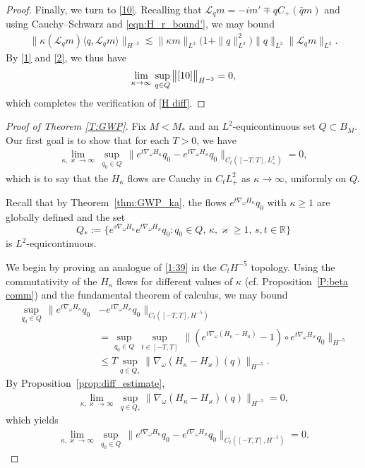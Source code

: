 \documentclass{amsart}
\numberwithin{equation}{section}
\theoremstyle{definition}
\newcommand{\om}{\omega}
\newcommand{\ka}{\kappa}
\newcommand{\vk}{\varkappa}
\newcommand{\R}{\mathbb{R}}
\newcommand{\Q}{\mathcal{Q}}
\newcommand{\Lc}{\mathcal{L}}
\newcommand{\na}{\nabla}
\begin{document}
\begin{proof}
Finally, we turn to \eqref{10}.  Recalling that $\Lc_qm=-im'\mp qC_+(\bar q m)$ and using Cauchy--Schwarz and \eqref{eqn:H_r_bound'}, we may bound
\begin{align*}
\bigl\|\ka (\Lc_qm)\langle q, \Lc_q m\rangle \bigr\|_{H^{-3}} \lesssim \|\ka m\|_{L^2} \bigl(1+ \|q\|_{L^2}^2\bigr) \|q\|_{L^2}\| \Lc_q m\|_{L^2}.
\end{align*}
By \eqref{1} and \eqref{2}, we thus have
\begin{align*}
\lim_{\ka\to\infty}\,\sup_{q\in Q}\,\bigl\|\eqref{10} \bigr\|_{H^{-3}}=0,
\end{align*}
which completes the verification of \eqref{H diff}.
\end{proof} 

\begin{proof}[Proof of Theorem \ref{T:GWP}]
Fix $M< M_\ast$ and an $L^2$-equicontinuous set $Q\subset B_M$. Our first goal is to show that for each $T>0$, we have
\begin{align}\label{1:39}
\lim_{\ka, \varkappa\to \infty} \, \sup_{q_0\in Q} \, \bigl\| e^{t\na_\om H_{\ka}}q_0 - e^{t\na_\om H_{\varkappa}}q_0  \bigr\|_{C_t([-T,T], L^2_+)} = 0,
\end{align}
which is to say that the $H_\ka$ flows are Cauchy in $C_tL_+^2$ as $\ka \to \infty$, uniformly on $Q$.

Recall that by Theorem~\ref{thm:GWP_ka}, the flows $e^{t\na_\om H_\ka}q_0$ with $\ka\geq1$ are globally defined and the set
$$
Q_{\ast}:=\{e^{s\na_\om H_{\ka}}e^{t\na_\om H_{\vk}}q_0: q_0\in Q,\,\ka,\vk\geq 1,\,s,t\in\R\}
$$
is $L^2$-equicontinuous.

We begin by proving an analogue of \eqref{1:39} in the $C_tH^{-5}$ topology.  Using the commutativity of the $H_\ka$ flows for different values of $\ka$ (cf. Proposition~\ref{P:beta comm}) and the fundamental theorem of calculus, we may bound
\begin{align*}
\sup_{q_0\in Q}\, \bigl\|e^{t \na_\om H_{\ka}}q_0 &-e^{t \na_\om H_{\vk}}q_0\bigr\|_{C_t([-T,T],H^{-5})}\\
&=\sup_{q_0\in Q}\, \sup_{t\in[-T,T]}\, \bigl\|(e^{t\na_\om(H_{\ka}-H_{\vk})}-1)\circ e^{t\na_\om H_{\vk}}q_0\bigr\|_{H^{-5}}\\
&\leq T\sup_{q\in Q_{\ast}}\|\na_\om(H_\ka-H_{\vk})(q)\|_{H^{-5}}.
\end{align*}
By Proposition~\ref{prop:diff_estimate},
\begin{align*}
\lim_{\ka, \varkappa\to \infty} \,\sup_{q\in Q_{\ast}}\|\na_\om(H_\ka-H_{\vk})(q)\|_{H^{-5}}=0,
\end{align*}
which yields
\begin{align}\label{1:40}
\lim_{\ka, \varkappa\to \infty} \, \sup_{q_0\in Q} \, \bigl\| e^{t\na_\om H_{\ka}}q_0 - e^{t\na_\om H_{\varkappa}}q_0  \bigr\|_{C_t([-T,T], H^{-5})} = 0.
\end{align}


\end{proof}
\end{document}
